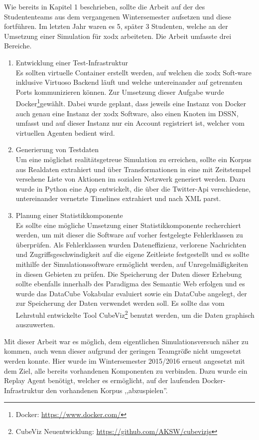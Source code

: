\documentclass{article}
\begin{document}
Wie bereits in Kapitel 1 beschrieben, sollte die Arbeit auf der des Studententeams aus dem vergangenen Wintersemester aufsetzen und diese fortführen. Im letzten Jahr waren es 5, später 3 Studenten, welche an der Umsetzung einer Simulation für xodx arbeiteten. Die Arbeit umfasste drei Bereiche.
\begin{enumerate}
	\item{Entwicklung einer Test-Infrastruktur\\
	Es sollten virtuelle Container erstellt werden, auf welchen die xodx Soft-ware inklusive Virtuoso Backend läuft und welche untereinander auf getrennten Ports kommunizieren können. Zur Umsetzung dieser Aufgabe wurde Docker\footnote{Docker: \url{https://www.docker.com/}}gewählt. Dabei wurde geplant, dass jeweils eine Instanz von Docker auch genau eine Instanz der xodx Software, also einen Knoten im DSSN, umfasst und auf dieser Instanz nur ein Account registriert ist, welcher vom virtuellen Agenten bedient wird.}
	\item{Generierung von Testdaten\\
	Um eine möglichst realitätsgetreue Simulation zu erreichen, sollte ein Korpus aus Realdaten extrahiert und über Transformationen in eine mit Zeitstempel versehene Liste von Aktionen im sozialen Netzwerk generiert werden. Dazu wurde in Python eine App entwickelt, die über die Twitter-Api verschiedene, untereinander vernetzte Timelines extrahiert und nach XML parst.}
	\item{Planung einer Statistikkomponente\\
	Es sollte eine mögliche Umsetzung einer Statistikkomponente  recherchiert werden, um mit dieser die Software auf vorher festgelegte Fehlerklassen zu überprüfen. Als Fehlerklassen wurden Dateneffizienz, verlorene Nachrichten und Zugriffsgeschwindigkeit auf die eigene Zeitleiste festgestellt und es sollte mithilfe der Simulationssoftware ermöglicht werden, auf Unregelmäßigkeiten in diesen Gebieten zu prüfen. Die Speicherung der Daten dieser Erhebung sollte ebenfalls innerhalb des Paradigma des Semantic Web erfolgen und es wurde das DataCube Vokabular evaluiert sowie ein DataCube angelegt, der zur Speicherung der Daten verwendet werden soll. Es sollte das vom Lehrstuhl entwickelte Tool CubeViz\cite{cubeviz}\footnote{CubeViz Neuentwicklung: \url{https://github.com/AKSW/cubevizjs}} benutzt werden, um die Daten graphisch auszuwerten.}
\end{enumerate}
Mit dieser Arbeit war es möglich, dem eigentlichen Simulationsversuch näher zu kommen, auch wenn dieser aufgrund der geringen Teamgröße nicht umgesetzt werden konnte. Hier wurde im Wintersemester 2015/2016 erneut angesetzt mit dem Ziel, alle bereits vorhandenen Komponenten zu verbinden. Dazu wurde ein Replay Agent benötigt, welcher es ermöglicht, auf der laufenden Docker-Infrastruktur den vorhandenen Korpus ,,abzuspielen''.\\
\end{document}
